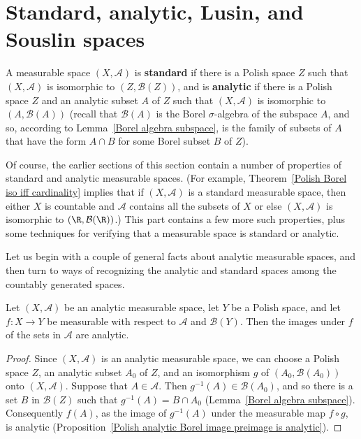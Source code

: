 \section{Standard, analytic, Lusin, and Souslin spaces}
A measurable space $(X,\mathcal{A})$ is \textbf{standard} if there is a Polish space $Z$ such that $(X,\mathcal{A})$ is isomorphic to $(Z,\mathcal{B}(Z))$, and is \textbf{analytic} if there is a Polish space $Z$ and an analytic subset $A$ of $Z$ such that $(X,\mathcal{A})$ is isomorphic to $(A,\mathcal{B}(A))$ (recall that $\mathcal{B}(A)$ is the Borel $\sigma$-algebra of the subspace $A$, and so, according to Lemma~\ref{Borel algebra subspace}, is the family of subsets of $A$ that have the form $A\cap B$ for some Borel subset $B$ of $Z$).\par
Of course, the earlier sections of this section contain a number of properties of standard and analytic measurable spaces. (For example, Theorem~\ref{Polish Borel iso iff cardinality} implies that if $(X,\mathcal{A})$ is a standard measurable space, then either $X$ is countable and $\mathcal{A}$ contains all the subsets of $X$ or else $(X,\mathcal{A})$ is isomorphic to $(\R,\mathcal{B}(\R))$.) This part contains a few more such properties, plus some techniques for verifying that a measurable space is standard or analytic.\par
Let us begin with a couple of general facts about analytic measurable spaces, and then turn to ways of recognizing the analytic and standard spaces among the countably generated spaces.
\begin{lemma}\label{analytic space image of Borel measurable is analytic}
Let $(X,\mathcal{A})$ be an analytic measurable space, let $Y$ be a Polish space, and let $f:X\to Y$ be measurable with respect to $\mathcal{A}$ and $\mathcal{B}(Y)$. Then the images under $f$ of the sets in $\mathcal{A}$ are analytic.
\end{lemma}
\begin{proof}
Since $(X,\mathcal{A})$ is an analytic measurable space, we can choose a Polish space $Z$, an analytic subset $A_0$ of $Z$, and an isomorphism $g$ of $(A_0,\mathcal{B}(A_0))$ onto $(X,\mathcal{A})$. Suppose that $A\in\mathcal{A}$. Then $g^{-1}(A)\in\mathcal{B}(A_0)$, and so there is a set $B$ in $\mathcal{B}(Z)$ such that $g^{-1}(A)=B\cap A_0$ (Lemma~\ref{Borel algebra subspace}). Consequently $f(A)$, as the image of $g^{-1}(A)$ under the measurable map $f\circ g$, is analytic (Proposition~\ref{Polish analytic Borel image preimage is analytic}).
\end{proof}
